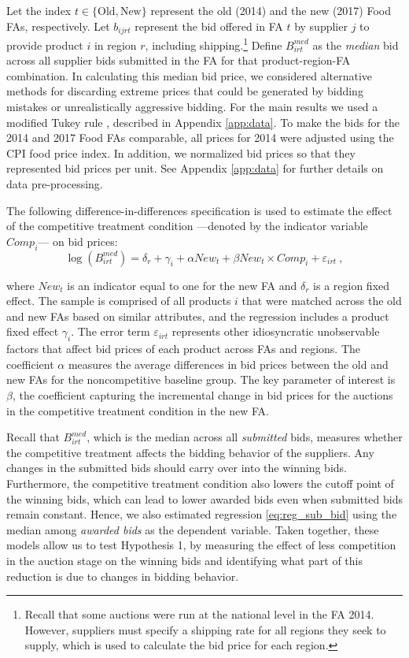Let the index $t\in\{\text{Old},\text{New}\}$ represent the old (2014) and the new (2017) Food FAs, respectively.  Let $b_{ijrt}$ represent the bid offered in FA $t$ by supplier $j$ to provide product $i$ in region $r$, including shipping.\footnote{Recall that some auctions were run at the national level in  the FA 2014. However, suppliers must specify a shipping rate for all regions they seek to supply, which is used to calculate the bid price for each region.} Define $B^{med}_{irt}$ as the \textit{median} bid across all supplier bids submitted in the FA for that product-region-FA combination. In calculating this median bid price, we considered alternative methods for discarding extreme prices that could be generated by bidding mistakes or unrealistically aggressive bidding. For the main results we used a modified Tukey rule \citep{Tukey1977}, described in Appendix \ref{app:data}. To make the bids for the 2014 and 2017 Food FAs comparable, all prices for 2014 were adjusted using the CPI food price index. In addition, we normalized bid prices so that they represented bid prices per unit. See  Appendix \ref{app:data} for further details on data pre-processing. 

The following difference-in-differences specification is used to estimate the effect of the competitive treatment condition ---denoted by the indicator variable $Comp_{i}$--- on bid prices:
\begin{equation}
    \log (B^{med}_{irt}) = \delta_r + \gamma_i + \alpha New_{t} + \beta New_{t}\times Comp_{i} + \varepsilon_{irt} \ ,
    \label{eq:reg_sub_bid}
\end{equation}

\noindent where $New_t$ is an indicator equal to one for the new FA and $\delta_r$ is a region fixed effect. The sample is comprised of all products $i$ that were matched across the old and new FAs based on similar attributes, and the regression includes a product fixed effect $\gamma_i$. {The error term $\varepsilon_{irt}$ represents other idiosyncratic unobservable factors that affect bid prices of each product across FAs and  regions.} The coefficient $\alpha$ measures the average differences in bid prices between the old and new FAs for the noncompetitive baseline group. The key parameter of interest is $\beta$, the coefficient capturing the incremental change in bid prices for the auctions in the competitive treatment condition in the new FA.

Recall that $B^{med}_{irt}$, which is the median across all \textit{submitted} bids, measures whether the competitive treatment affects the bidding behavior of the suppliers.  Any changes in the submitted bids should carry over into the winning bids. Furthermore, the competitive treatment condition also lowers the cutoff point of the winning bids, which can lead to lower awarded bids even when submitted bids remain constant. Hence, we also estimated regression \eqref{eq:reg_sub_bid} using the median among \textit{awarded bids} as the dependent variable. Taken together, these models allow us to test Hypothesis 1, by measuring the effect of less competition in the auction stage on the winning bids and identifying what part of this reduction is due to changes in bidding behavior.



